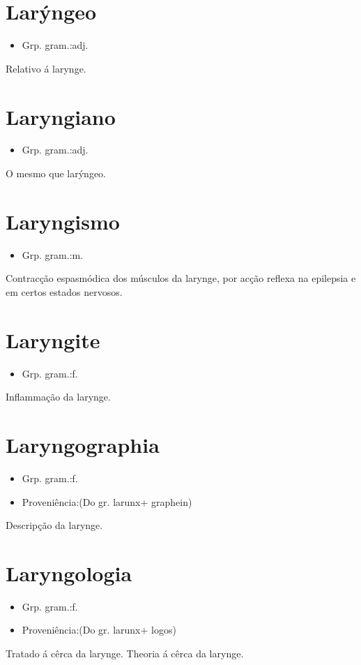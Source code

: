 \section{Larýngeo}
\begin{itemize}
\item {Grp. gram.:adj.}
\end{itemize}
Relativo á larynge.
\section{Laryngiano}
\begin{itemize}
\item {Grp. gram.:adj.}
\end{itemize}
O mesmo que \textunderscore larýngeo\textunderscore .
\section{Laryngismo}
\begin{itemize}
\item {Grp. gram.:m.}
\end{itemize}
Contracção espasmódica dos músculos da larynge, por acção reflexa na epilepsia e em certos estados nervosos.
\section{Laryngite}
\begin{itemize}
\item {Grp. gram.:f.}
\end{itemize}
Inflammação da larynge.
\section{Laryngographia}
\begin{itemize}
\item {Grp. gram.:f.}
\end{itemize}
\begin{itemize}
\item {Proveniência:(Do gr. \textunderscore larunx\textunderscore  + \textunderscore graphein\textunderscore )}
\end{itemize}
Descripção da larynge.
\section{Laryngologia}
\begin{itemize}
\item {Grp. gram.:f.}
\end{itemize}
\begin{itemize}
\item {Proveniência:(Do gr. \textunderscore larunx\textunderscore  + \textunderscore logos\textunderscore )}
\end{itemize}
Tratado á cêrca da larynge.
Theoria á cêrca da larynge.
